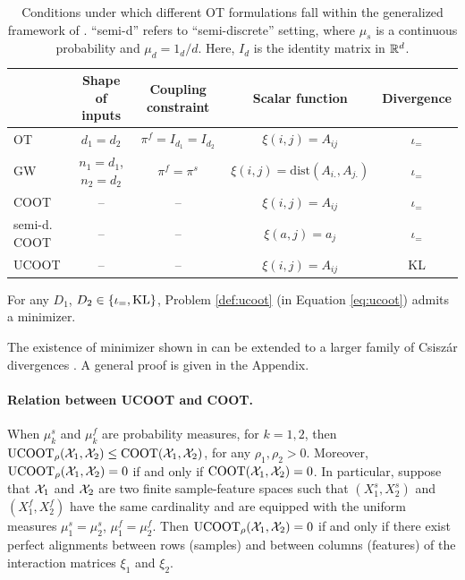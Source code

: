 \begin{table}[t]
  \centering
  \small
  \begin{tabular}{l *4c}
      \toprule
          & Shape of inputs & Coupling constraint & Scalar function & Divergence \\
      \midrule
      OT   & $d_1 = d_2$              & $\pi^f = I_{d_1} = I_{d_2}$ & $\xi(i, j) = A_{ij}$                        & $\iota_=$ \\
      GW   & $n_1 = d_1$, $n_2 = d_2$ & $\pi^f = \pi^s$             & $\xi(i, j) = \text{dist}( A_{i.}, A_{j.} )$ & $\iota_=$ \\
      COOT & --                       & --                          & $\xi(i, j) = A_{ij}$                        & $\iota_=$ \\
      semi-d. COOT & --               & --                          & $\xi(a, j) = a_j$                           & $\iota_=$ \\
      UCOOT & --                      & --                          & $\xi(i, j) = A_{ij}$                        & KL \\
        \bottomrule
        \hline
        \end{tabular}
        \caption{Conditions under which different OT formulations fall within
        the generalized framework of .
        ``semi-d'' refers to ``semi-discrete'' setting, where
        $\mu_s$ is a continuous probability and $\mu_d = 1_d/d$.
        Here, $I_d$ is the identity matrix in $\mathbb R^d$.
  \label{t:examples}}
\end{table}
\begin{proposition} \label{prop:existence}
For any $D_1$, $D_2 \in \{ \iota_{=}, \text{KL} \}$, Problem \eqref{def:ucoot} (in Equation \eqref{eq:ucoot})
admits a minimizer.
\end{proposition}

\begin{remark}
The existence of minimizer shown in 
can be extended to a larger family of Csiszár divergences \citep{Csiszar63}.
A general proof is given in the Appendix.
\end{remark}

\paragraph{Relation between UCOOT and COOT.} When $ \mu^s_k$ and $\mu^f_k$ are probability measures,
for $k=1,2$, then $\text{UCOOT}_{\rho}(\mathcal X_1, \mathcal X_2) \leq \text{COOT}(\mathcal X_1, \mathcal X_2)$,
for any $\rho_1, \rho_2 > 0$.
Moreover, $\text{UCOOT}_{\rho}(\mathcal X_1, \mathcal X_2) = 0$ if and only if $\text{COOT}(\mathcal X_1, \mathcal X_2) = 0$.
In particular, suppose that $\mathcal X_1$ and $\mathcal X_2$ are two finite sample-feature spaces
such that $(X^s_1, X^s_2)$ and $(X^f_1, X^f_2)$ have the same cardinality and
are equipped with the uniform measures $\mu_1^s = \mu_2^s$, $\mu_1^f = \mu_2^f$.
Then $\text{UCOOT}_{\rho}(\mathcal X_1, \mathcal X_2) = 0$ if and only if
there exist perfect alignments between rows (samples) and between
columns (features) of the interaction matrices $\xi_1$ and $\xi_2$.


